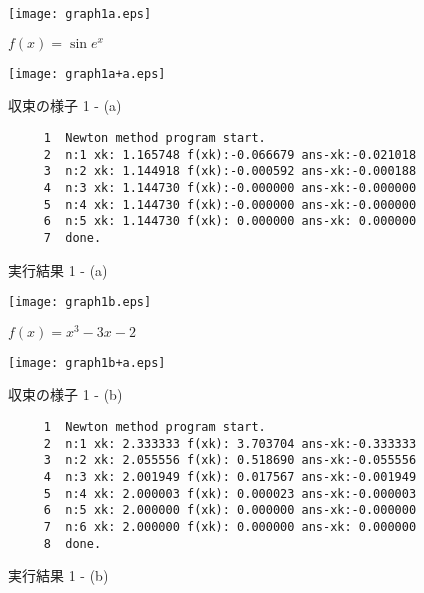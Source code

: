 \documentclass[12pt]{jarticle}
\begin{document}
\begin{figure}[t]
 \begin{minipage}{7.95cm}
  \center
  \texttt{[image: graph1a.eps]}
  \caption{$f(x)=\sin e^x$}
  \label{fig:1a}
 \end{minipage}
 \begin{minipage}{7.95cm}
  \center
  \texttt{[image: graph1a+a.eps]}
  \caption{収束の様子 1 - (a)}
  \label{fig:1a+a}
 \end{minipage}
\begin{screen}
\begin{verbatim}
     1	Newton method program start.
     2	n:1 xk: 1.165748 f(xk):-0.066679 ans-xk:-0.021018
     3	n:2 xk: 1.144918 f(xk):-0.000592 ans-xk:-0.000188
     4	n:3 xk: 1.144730 f(xk):-0.000000 ans-xk:-0.000000
     5	n:4 xk: 1.144730 f(xk):-0.000000 ans-xk:-0.000000
     6	n:5 xk: 1.144730 f(xk): 0.000000 ans-xk: 0.000000
     7	done.
\end{verbatim}
\end{screen}
\caption{実行結果 1 - (a)}
\label{fig:1aa}
\end{figure}

\begin{figure}[t]
 \begin{minipage}{7.95cm}
  \center
  \texttt{[image: graph1b.eps]}
  \caption{$f(x)=x^3-3x-2$}
  \label{fig:1b}
 \end{minipage}
 \begin{minipage}{7.95cm}
  \center
  \texttt{[image: graph1b+a.eps]}
  \caption{収束の様子 1 - (b)}
  \label{fig:1b+a}
 \end{minipage}
\begin{screen}
\begin{verbatim}
     1	Newton method program start.
     2	n:1 xk: 2.333333 f(xk): 3.703704 ans-xk:-0.333333
     3	n:2 xk: 2.055556 f(xk): 0.518690 ans-xk:-0.055556
     4	n:3 xk: 2.001949 f(xk): 0.017567 ans-xk:-0.001949
     5	n:4 xk: 2.000003 f(xk): 0.000023 ans-xk:-0.000003
     6	n:5 xk: 2.000000 f(xk): 0.000000 ans-xk:-0.000000
     7	n:6 xk: 2.000000 f(xk): 0.000000 ans-xk: 0.000000
     8	done.
\end{verbatim}
\end{screen}
\caption{実行結果 1 - (b)}
\label{fig:1bb}
\end{figure}
\end{document}
